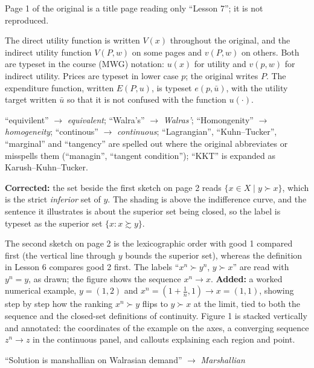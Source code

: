 \documentclass[11pt]{article}
\begin{document}
\begin{transcriptnotes}
  \item Page 1 of the original is a title page reading only ``Lesson 7''; it is
        not reproduced.
  \item The direct utility function is written $V(x)$ throughout the original,
        and the indirect utility function $V(P,w)$ on some pages and $v(P,w)$ on
        others. Both are typeset in the course (MWG) notation: $u(x)$ for utility
        and $v(p,w)$ for indirect utility. Prices are typeset in lower case $p$;
        the original writes $P$. The expenditure function, written $E(P,u)$, is
        typeset $e(p,\bar u)$, with the utility target written $\bar u$ so that it
        is not confused with the function $u(\cdot)$.
  \item ``equivilent'' $\to$ \emph{equivalent}; ``Walra's'' $\to$ \emph{Walras'};
        ``Homongenity'' $\to$ \emph{homogeneity}; ``continous'' $\to$
        \emph{continuous}; ``Lagrangian'', ``Kuhn--Tucker'', ``marginal'' and
        ``tangency'' are spelled out where the original abbreviates or misspells
        them (``managin'', ``tangent condition''); ``KKT'' is expanded as
        Karush--Kuhn--Tucker.
  \item \textbf{Corrected:} the set beside the first sketch on page 2 reads
        $\{x\in X \mid y\succ x\}$, which is the strict \emph{inferior} set of $y$.
        The shading is above the indifference curve, and the sentence it
        illustrates is about the superior set being closed, so the label is
        typeset as the superior set $\{x : x\succsim y\}$.
  \item The second sketch on page 2 is the lexicographic order with good 1 compared
        first (the vertical line through $y$ bounds the superior set), whereas the
        definition in Lesson 6 compares good 2 first. The labels
        ``$x^{n}\succ y^{n}$, $y\succ x$'' are read with $y^{n}=y$, as drawn; the
        figure shows the sequence $x^{n}\to x$. \textbf{Added:} a worked numerical example,
        $y=(1,2)$ and $x^{n}=(1+\frac1n,1)\to x=(1,1)$, showing step by step how the
        ranking $x^{n}\succ y$ flips to $y\succ x$ at the limit, tied to both the
        sequence and the closed-set definitions of continuity. Figure 1 is
        stacked vertically and annotated: the coordinates of the example on
        the axes, a converging sequence $z^{n}\to z$ in the continuous panel,
        and callouts explaining each region and point.
  \item ``Solution is manshallian on Walrasian demand'' $\to$ \emph{Marshallian
}
\end{transcriptnotes}
\end{document}

